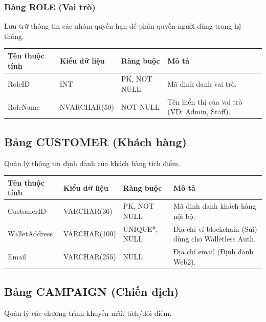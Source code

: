 \subsubsection{Bảng ROLE (Vai trò)}
Lưu trữ thông tin các nhóm quyền hạn để phân quyền người dùng trong hệ thống.

\begin{table}[H]
\centering
\begin{tabular}{|l|l|l|p{5cm}|}
\hline
\textbf{Tên thuộc tính} & \textbf{Kiểu dữ liệu} & \textbf{Ràng buộc} & \textbf{Mô tả} \\ \hline
RoleID & INT & PK, NOT NULL & Mã định danh vai trò. \\ \hline
RoleName & NVARCHAR(50) & NOT NULL & Tên hiển thị của vai trò (VD: Admin, Staff). \\ \hline
\end{tabular}
\end{table}

\subsection{Bảng CUSTOMER (Khách hàng)}
Quản lý thông tin định danh của khách hàng tích điểm.

\begin{table}[H]
    \centering
    \renewcommand{\arraystretch}{1.3}
    \begin{tabular}{|>{\raggedright\arraybackslash}p{3cm}|>{\raggedright\arraybackslash}p{3.2cm}|>{\raggedright\arraybackslash}p{2.5cm}|>{\raggedright\arraybackslash}p{5.5cm}|}
        \hline
        \textbf{Tên thuộc tính} & \textbf{Kiểu dữ liệu} & \textbf{Ràng buộc} & \textbf{Mô tả} \\ \hline
        CustomerID & VARCHAR(36) & PK, NOT NULL & Mã định danh khách hàng nội bộ. \\ \hline
        WalletAddress & VARCHAR(100) & UNIQUE*, NULL & Địa chỉ ví blockchain (Sui) dùng cho Walletless Auth. \\ \hline
        Email & VARCHAR(255) & NULL & Địa chỉ email (Định danh Web2). \\ \hline
    \end{tabular}
\end{table}

\subsection{Bảng CAMPAIGN (Chiến dịch)}
Quản lý các chương trình khuyến mãi, tích/đổi điểm.

